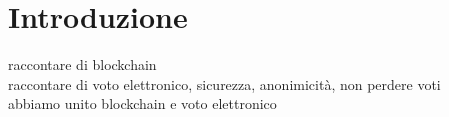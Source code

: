 \chapter*{Introduzione}


raccontare di blockchain\\

raccontare di voto elettronico, sicurezza, anonimicità, non perdere voti\\

abbiamo unito blockchain e voto elettronico\\

